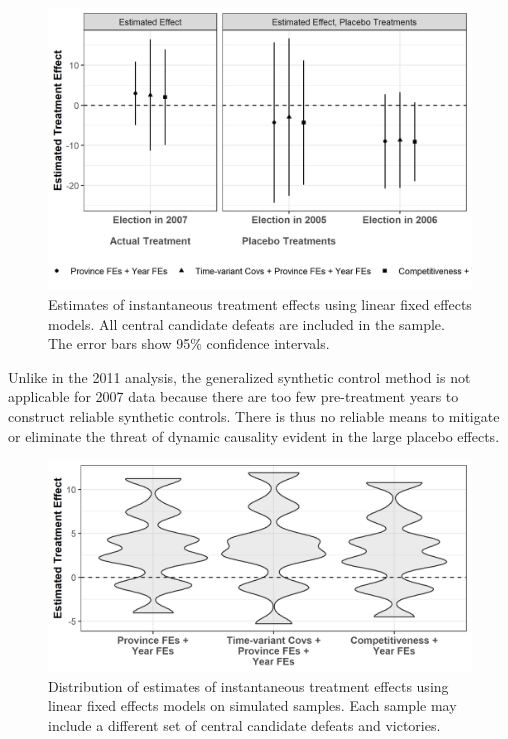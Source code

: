\documentclass[12pt]{article}
\newcommand{\1}{\mathbbm{1}}
\begin{document}
\begin{figure}[!htbp]
	\centering
	\includegraphics[width=.75\textwidth]{figure/200202_lfe_placebo_2007.png}
	\captionsetup{singlelinecheck=off}
	\caption[Estimated placebo linear fixed effects treatment effects]{Estimates of instantaneous treatment effects using linear fixed effects models. All central candidate defeats are included in the sample. The error bars show 95\% confidence intervals.}
	\label{fig:lfe_placebo_2007}
\end{figure}

Unlike in the 2011 analysis, the generalized synthetic control method \citep{Xu2017gsynth} is not applicable for 2007 data because there are too few pre-treatment years to construct reliable synthetic controls. There is thus no reliable means to mitigate or eliminate the threat of dynamic causality evident in the large placebo effects. 

\begin{figure}[!htbp]
	\centering
	\includegraphics[width=.75\textwidth]{figure/200202_impute_results_2007.png}
	\captionsetup{singlelinecheck=off}
	\caption[Estimated linear fixed effects treatment effects using simulated vote shares]{Distribution of estimates of instantaneous treatment effects using linear fixed effects models on simulated samples. Each sample may include a different set of central candidate defeats and victories.}
	\label{fig:impute_results_2007}
\end{figure}
\end{document}

